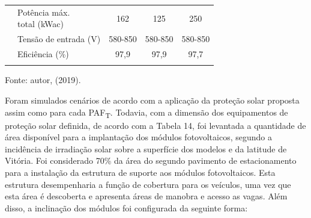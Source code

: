 \begin{table}[H]
\begin{tabular}{lllll}
                                                                                                    & \makecell[l]{Potência máx. \\total (kWac)}    & \multicolumn{1}{c}{162}                                   & \multicolumn{1}{c}{125}                                 & \multicolumn{1}{c}{250}                                    \\
                                                                                                    & Tensão de entrada (V)                         & \multicolumn{1}{c}{580-850}                               & \multicolumn{1}{c}{580-850}                            & \multicolumn{1}{c}{580-850}                               \\
                                                                                                    & Eficiência (\%)                               & \multicolumn{1}{c}{97,9}                                  & \multicolumn{1}{c}{97,9}                               & \multicolumn{1}{c}{97,7}                                  \\ \hline
                                                                                                    &                                               &                                                           &                                                        &                                                          
    \end{tabular}
    \begin{flushleft}
        \par \small Fonte: autor, (2019).
    \end{flushleft}
    \label{tab:tabela14}
    \end{table}
    \vspace{-0.60cm} \noindent Foram simulados cenários de acordo com a aplicação da proteção solar proposta assim como para cada PAF\textsubscript{T}. Todavia, com a dimensão dos equipamentos de proteção solar definida, de acordo com a Tabela 14, foi levantada a quantidade de área disponível para a implantação dos módulos fotovoltaicos, segundo a incidência de irradiação solar sobre a superfície dos modelos e da latitude de Vitória.\newline
    \noindent Foi considerado 70\% da área do segundo pavimento de estacionamento para a instalação da estrutura de suporte aos módulos fotovoltaicos. Esta estrutura desempenharia a função de cobertura para os veículos, uma vez que esta área é descoberta e apresenta áreas de manobra e acesso as vagas. Além disso, a inclinação dos módulos foi configurada da seguinte forma:
